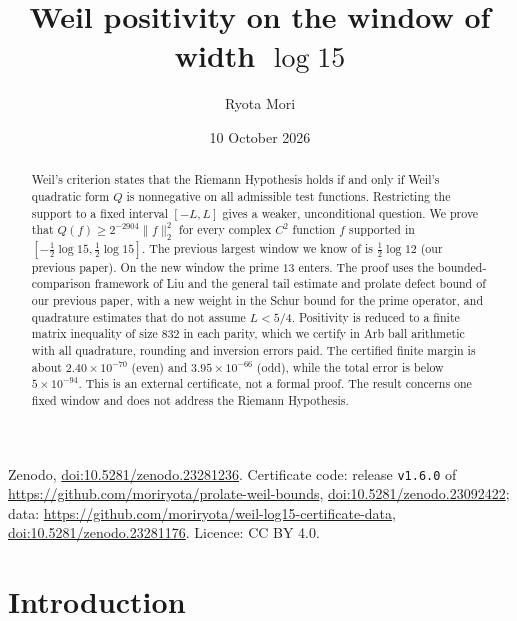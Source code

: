 \documentclass[11pt]{amsart}
\title[Weil positivity on the window of width $\log 15$]{Weil positivity on the window of width $\log 15$}
\author{Ryota Mori}
\date{10 October 2026}
\newcommand{\doi}[1]{\href{https://doi.org/#1}{doi:#1}}
\theoremstyle{remark}
\numberwithin{equation}{section}
\begin{document}
\begin{abstract}
Weil's criterion states that the Riemann Hypothesis holds if and only if Weil's quadratic form $Q$ is nonnegative on all admissible test functions. Restricting the support to a fixed interval $[-L,L]$ gives a weaker, unconditional question. We prove that $Q(f)\ge2^{-2904}\|f\|_2^2$ for every complex $C^2$ function $f$ supported in $[-\tfrac12\log15,\tfrac12\log15]$. The previous largest window we know of is $\tfrac12\log12$ (our previous paper). On the new window the prime $13$ enters. The proof uses the bounded-comparison framework of Liu and the general tail estimate and prolate defect bound of our previous paper, with a new weight in the Schur bound for the prime operator, and quadrature estimates that do not assume $L<5/4$. Positivity is reduced to a finite matrix inequality of size $832$ in each parity, which we certify in Arb ball arithmetic with all quadrature, rounding and inversion errors paid. The certified finite margin is about $2.40\times10^{-70}$ (even) and $3.95\times10^{-66}$ (odd), while the total error is below $5\times10^{-94}$. This is an external certificate, not a formal proof. The result concerns one fixed window and does not address the Riemann Hypothesis.
\end{abstract}

\maketitle

\begin{sloppypar}
\noindent Zenodo, \doi{10.5281/zenodo.23281236}. Certificate code: release \texttt{v1.6.0} of \url{https://github.com/moriryota/prolate-weil-bounds}, \doi{10.5281/zenodo.23092422}; data: \url{https://github.com/moriryota/weil-log15-certificate-data}, \doi{10.5281/zenodo.23281176}. Licence: CC BY 4.0.
\end{sloppypar}

\begin{center}
\end{center}

\section{Introduction}
\end{document}
